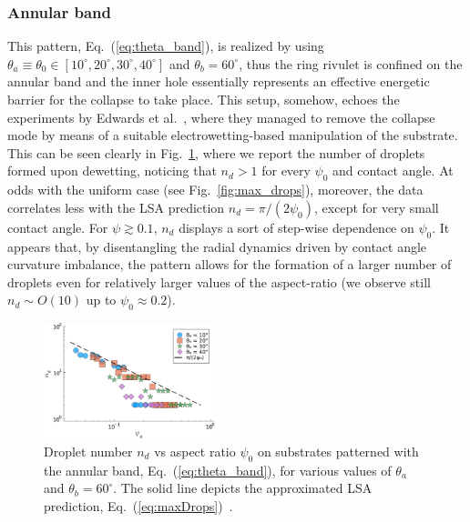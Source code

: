 \documentclass[twoside,twocolumn,9pt]{article}
\begin{document}
\subsubsection{Annular band}\label{subsubsec:banded}
This pattern, Eq.~(\ref{eq:theta_band}), is realized by using $\theta_a \equiv \theta_0 \in [10^{\circ}, 20^{\circ}, 30^{\circ}, 40^{\circ}]$ and $\theta_b = 60^{\circ}$, thus the ring rivulet is confined on the annular band and the inner hole essentially represents an effective energetic barrier for the collapse to take place.
This setup, somehow, echoes the experiments by Edwards et al.~\cite{edwardsControllingBreakupToroidal2021}, where they managed to remove the collapse mode by means of a suitable electrowetting-based manipulation of the substrate.
This can be seen clearly in Fig.~\ref{fig:max_drops_band}, where we report the number of droplets formed upon dewetting, noticing that $n_d>1$ for every $\psi_0$ and contact angle. 
At odds with the uniform case (see Fig.~\ref{fig:max_drops}), moreover, the data correlates less with the LSA prediction $n_d = \pi/(2\psi_0)$, except for very small contact angle. 
For $\psi \gtrsim 0.1$, $n_d$ displays a sort of step-wise dependence on $\psi_0$. 
It appears that, by disentangling the radial dynamics driven by contact angle curvature imbalance, the pattern allows for the formation of a larger number of droplets even for relatively larger values of the aspect-ratio (we observe still $n_d \sim O(10)$ up to $\psi_0 \approx 0.2$).
\begin{figure}
    \centering
    \includegraphics[width=0.45\textwidth]{Figure_5.pdf}    
    \caption{Droplet number $n_d$ vs aspect ratio $\psi_0$ on substrates patterned with the annular band, Eq.~(\ref{eq:theta_band}), for various values of $\theta_a$ and $\theta_b = 60^{\circ}$. 
    The solid line depicts the approximated LSA prediction, Eq.~(\ref{eq:maxDrops})~\cite{gonzalezStabilityLiquidRing2013}.}
    \label{fig:max_drops_band}
\end{figure}
\end{document}
